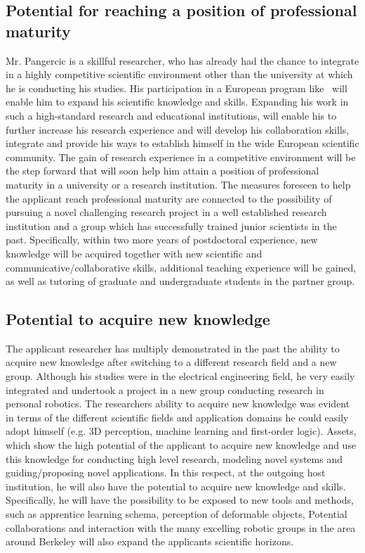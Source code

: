 \subsection{Potential for reaching a position of professional maturity}
Mr. Pangercic is a skillful researcher, who has already had the chance to integrate in a highly 
competitive scientific environment other than the university at which he is conducting his
studies.  His participation in a European program like \ksem\ will enable him to expand 
his scientific knowledge and skills. Expanding his work in such a high-standard research 
and educational institutions, will enable his to further increase his 
research experience and will develop his collaboration skills, integrate and  provide his 
ways to establish himself in the wide European scientific community. The gain of research 
experience in a competitive environment will be the step forward that will soon help him
attain a position of professional maturity in a university or a research institution. The 
measures foreseen to help the applicant reach professional maturity are connected to the 
possibility of pursuing a novel challenging research project in a well established research 
institution and a group which has successfully trained junior scientists in the past. 
Specifically, within two more years of postdoctoral experience, new knowledge will be 
acquired together with new scientific and communicative/collaborative skills, additional 
teaching experience will be gained, as well as tutoring of graduate and undergraduate 
students in the partner group. \\
\subsection{Potential to acquire new knowledge}
The applicant researcher has multiply demonstrated in the past the ability to acquire new 
knowledge after switching to a different research field and a new group. Although his
studies were in the electrical engineering field, he very 
easily integrated and undertook a project in a new group conducting  research in personal
robotics. The researchers ability to acquire new knowledge was evident in terms of 
the different scientific fields and application domains he could easily adopt himself (e.g. 3D perception, machine
learning and first-order logic). Assets, which show the high potential of the applicant to acquire new 
knowledge and use this knowledge for conducting high level research, modeling novel 
systems and guiding/proposing novel applications. In this respect, at the 
outgoing host institution, he will also have the potential to acquire new knowledge and skills. 
Specifically, he will have the possibility to be exposed to new tools and methods, such as 
apprentice learning schema, perception of deformable objects, 
Potential collaborations and interaction with the many excelling 
robotic groups in the area around Berkeley will also 
expand the applicants scientific horizons. 

\newpage
